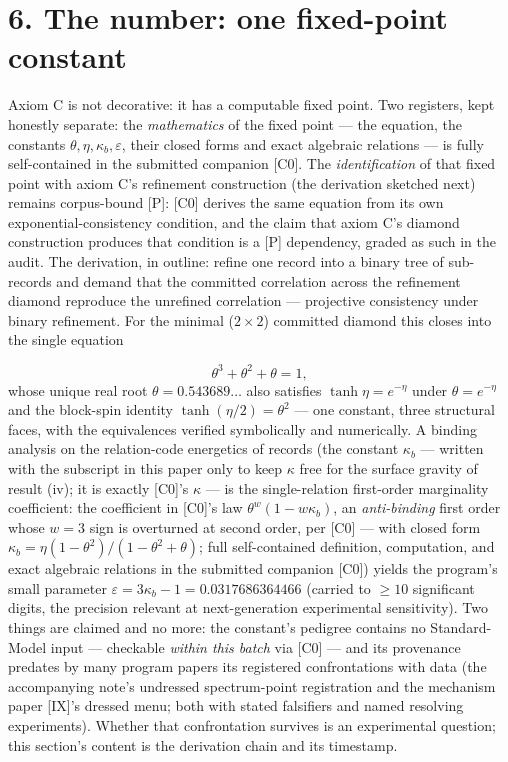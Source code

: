 \documentclass[11pt]{article}
\begin{document}
\section*{6. The number: one fixed-point constant}
Axiom C is not decorative: it has a computable fixed point.  Two registers, kept honestly separate: the \emph{mathematics} of the fixed point — the equation, the constants $\theta, \eta, \kappa_b, \varepsilon$, their closed forms and exact algebraic relations — is fully self-contained in the submitted companion [C0].  The \emph{identification} of that fixed point with axiom C's refinement construction (the derivation sketched next) remains corpus-bound [P]: [C0] derives the same equation from its own exponential-consistency condition, and the claim that axiom C's diamond construction produces that condition is a [P] dependency, graded as such in the audit.  The derivation, in outline: refine one record into a binary tree of sub-records and demand that the committed correlation across the refinement diamond reproduce the unrefined correlation — projective consistency under binary refinement.  For the minimal ($2\times 2$) committed diamond this closes into the single equation

\[
\theta^3 + \theta^2 + \theta = 1,
\]
whose unique real root $\theta = 0.543689\ldots$ also satisfies $\tanh\eta = e^{-\eta}$ under $\theta = e^{-\eta}$ and the block-spin identity $\tanh(\eta/2) = \theta^2$ — one constant, three structural faces, with the equivalences verified symbolically and numerically.  A binding analysis on the relation-code energetics of records (the constant $\kappa_b$ — written with the subscript in this paper only to keep $\kappa$ free for the surface gravity of result (iv); it is exactly [C0]'s $\kappa$ — is the single-relation first-order marginality coefficient: the coefficient in [C0]'s law $\theta^w(1 - w\kappa_b)$, an \emph{anti-binding} first order whose $w = 3$ sign is overturned at second order, per [C0] — with closed form $\kappa_b = \eta(1-\theta^2)/(1-\theta^2+\theta)$; full self-contained definition, computation, and exact algebraic relations in the submitted companion [C0]) yields the program's small parameter $\varepsilon = 3\kappa_b - 1 = 0.0317686364466$ (carried to $\ge 10$ significant digits, the precision relevant at next-generation experimental sensitivity).  Two things are claimed and no more: the constant's pedigree contains no Standard-Model input — checkable \emph{within this batch} via [C0] — and its provenance predates by many program papers its registered confrontations with data (the accompanying note's undressed spectrum-point registration and the mechanism paper [IX]'s dressed menu; both with stated falsifiers and named resolving experiments).  Whether that confrontation survives is an experimental question; this section's content is the derivation chain and its timestamp.
\end{document}
